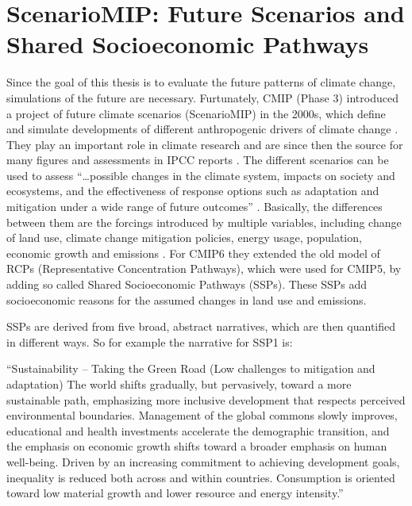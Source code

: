 \section{ScenarioMIP: Future Scenarios and Shared Socioeconomic Pathways}

\label{sec:scenariomip}

Since the goal of this thesis is to evaluate the future patterns of climate change, simulations of the future are necessary. 
Furtunately, CMIP (Phase 3) introduced a project of future climate scenarios (ScenarioMIP) in the 2000s, which define and simulate developments of different anthropogenic drivers of climate change \cite{oneill_scenario_2016}. 
They play an important role in climate research and are since then the source for many figures and assessments in IPCC reports \cite{touzepeiffer_coupled_2020}. 
The different scenarios can be used to assess \enquote{\dots possible changes in the climate system, impacts on society and ecosystems, and the effectiveness of response options such as adaptation and mitigation under a wide range of future outcomes} \cite{oneill_scenario_2016}.
Basically, the differences between them are the forcings introduced by multiple variables, including change of land use, climate change mitigation policies, energy usage, population, economic growth and emissions \cite{riahi_shared_2017}.   
For CMIP6 they extended the old model of RCPs (Representative Concentration Pathways), which were used for CMIP5, by adding so called Shared Socioeconomic Pathways (SSPs). 
These SSPs add socioeconomic reasons for the assumed changes in land use and emissions. 


SSPs are derived from five broad, abstract narratives, which are then quantified in different ways. 
So for example the narrative for SSP1 is: 

\begin{center}
  \enquote{Sustainability – Taking the Green Road (Low challenges to mitigation and adaptation) The world shifts gradually, but pervasively, toward a more sustainable path, emphasizing more inclusive development that respects perceived environmental boundaries. Management of the global commons slowly improves, educational and health investments accelerate the demographic transition, and the emphasis on economic growth shifts toward a broader emphasis on human well-being. Driven by an increasing commitment to achieving development goals, inequality is reduced both across and within countries. Consumption is oriented toward low material growth and lower resource and energy intensity.} \cite{riahi_shared_2017}
\end{center}

